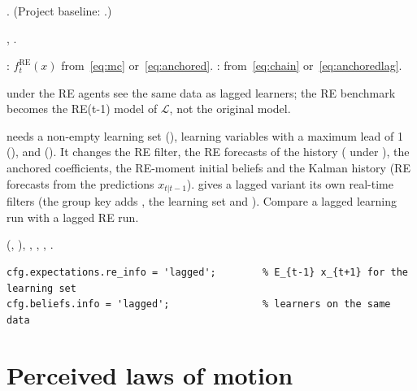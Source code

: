 \documentclass[11pt,a4paper]{article}
\DeclareRobustCommand{\codem}[1]{\texttt{\detokenize{#1}}}
\newenvironment{optspec}%
  {\begin{description}[style=sameline,leftmargin=2.7cm,labelwidth=2.5cm,font=\normalfont\itshape]}%
  {\end{description}}
\newcommand{\RE}{\mathrm{RE}}
\newcommand{\fRE}{f^{\RE}}
\begin{document}
\subsubsection{\texorpdfstring{\codem{expectations.re_info}}{expectations.re\_info}}\label{opt:expectations-re-info}
\begin{optspec}
  \item[Default] . (Project baseline: .)
  \item[Values] , .
  \item[Math] : $\fRE_t(x)$ from~\eqref{eq:mc} or~\eqref{eq:anchored}.
        : from~\eqref{eq:chain} or~\eqref{eq:anchoredlag}.
  \item[Assumptions] under  the RE agents see the same data as lagged learners;
        the RE benchmark becomes the RE(t-1) model of $\mathcal{L}$, not the original model.
  \item[Interactions]  needs a non-empty learning set
        (), learning variables with a maximum lead of 1
        (), and 
        (). It changes the RE filter, the RE forecasts of the
        history ( under ), the anchored coefficients, the
        RE-moment initial beliefs and the Kalman history (RE forecasts from the predictions
        $x_{t|t-1}$).  gives a lagged variant its own real-time filters
        (the group key adds , the learning set and ). Compare a
        lagged learning run with a lagged RE run.
  \item[Code]  (, ),
        , , ,
        .
  \item[Example]
\begin{lstlisting}
cfg.expectations.re_info = 'lagged';        % E_{t-1} x_{t+1} for the learning set
cfg.beliefs.info = 'lagged';                % learners on the same data
\end{lstlisting}
\end{optspec}

\section{Perceived laws of motion}\label{sec:plm}
\end{document}
